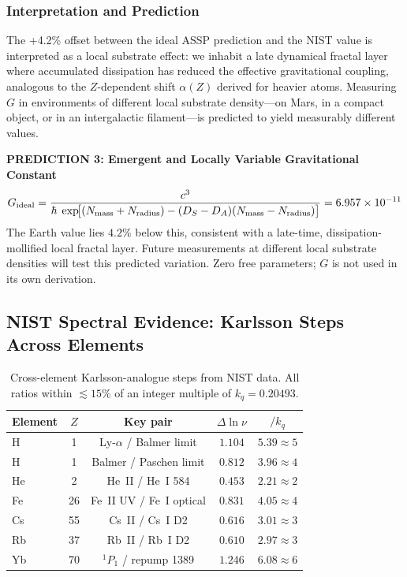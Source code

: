 \documentclass[11pt,a4paper]{article}
\begin{document}
\subsubsection{Interpretation and Prediction}

The +4.2\% offset between the ideal ASSP prediction and the NIST value is interpreted as a local substrate effect: we inhabit a late dynamical fractal layer where accumulated dissipation has reduced the effective gravitational coupling, analogous to the $Z$-dependent shift $\alpha(Z)$ derived for heavier atoms. Measuring $G$ in environments of different local substrate density---on Mars, in a compact object, or in an intergalactic filament---is predicted to yield measurably different values.

\begin{mdframed}
\centering
\textbf{PREDICTION 3: Emergent and Locally Variable Gravitational Constant}\\[0.5em]
\[
G_{\rm ideal} = \frac{c^3}{\hbar\;\exp\!\bigl[
  (N_{\rm mass}+N_{\rm radius})
  -(D_S-D_A)(N_{\rm mass}-N_{\rm radius})
\bigr]} = 6.957\times10^{-11}
\]
The Earth value lies $4.2\%$ below this, consistent with a late-time, dissipation-mollified local fractal layer. Future measurements at different local substrate densities will test this predicted variation. Zero free parameters; $G$ is not used in its own derivation.
\end{mdframed}

\subsection{NIST Spectral Evidence: Karlsson Steps Across Elements}

\begin{table}[h]
\centering\small
\begin{tabular}{|l|c|c|c|c|}
\hline
\textbf{Element} & $Z$ & \textbf{Key pair} & \textbf{$\Delta\ln\nu$}
  & \textbf{$/k_q$} \\
\hline
H  & 1  & Ly-$\alpha$ / Balmer limit & $1.104$ & $5.39\approx5$ \\
H  & 1  & Balmer / Paschen limit      & $0.812$ & $3.96\approx4$ \\
He & 2  & He~II / He~I 584            & $0.453$ & $2.21\approx2$ \\
Fe & 26 & Fe~II UV / Fe~I optical     & $0.831$ & $4.05\approx4$ \\
Cs & 55 & Cs~II / Cs~I D2             & $0.616$ & $3.01\approx3$ \\
Rb & 37 & Rb~II / Rb~I D2             & $0.610$ & $2.97\approx3$ \\
Yb & 70 & $^1P_1$ / repump 1389       & $1.246$ & $6.08\approx6$ \\
\hline
\end{tabular}
\caption{Cross-element Karlsson-analogue steps from NIST data. All ratios within $\lesssim15\%$ of an integer multiple of $k_q=0.20493$.}
\end{table}
\end{document}
